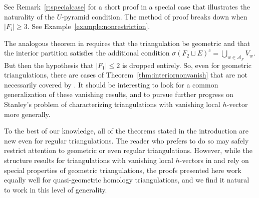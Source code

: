 See Remark~\ref{r:specialcase} for a short proof in a special case that illustrates the naturality of the 
$U$-pyramid condition.
The method of proof breaks down when $|F_i| \geq 3$.  See Example~\ref{example:nonrestriction}.  


\begin{remark}
The analogous theorem in \cite{LarsonPayneStapledon} requires that the triangulation be geometric and that the interior partition satisfies the additional condition $\sigma(F_2 \sqcup E)^c = \bigcup_{w \in \mathcal{A}_F} V_w$.  But then the hypothesis that $|F_1| \leq 2$ is dropped entirely.  So, even for geometric triangulations, there are cases of Theorem~\ref{thm:interiornonvanish} that are not necessarily covered by \cite[Theorem~4.1.3]{LarsonPayneStapledon}. It should be interesting to look for a common generalization of these vanishing results, and to pursue further progress on Stanley's problem of characterizing triangulations with vanishing local $h$-vector more generally.
\end{remark}


\begin{remark}
To the best of our knowledge, all of the theorems stated in the introduction are new even for regular triangulations. The reader who prefers to do so may safely restrict attention to geometric or even regular triangulations.  However, while the structure results for triangulations with vanishing local $h$-vectors in \cite{dMGPSS20} and \cite{LarsonPayneStapledon} rely on special properties of geometric triangulations, the proofs presented here work equally well for quasi-geometric homology triangulations, and we find it  natural to work in this level of generality.
\end{remark}
